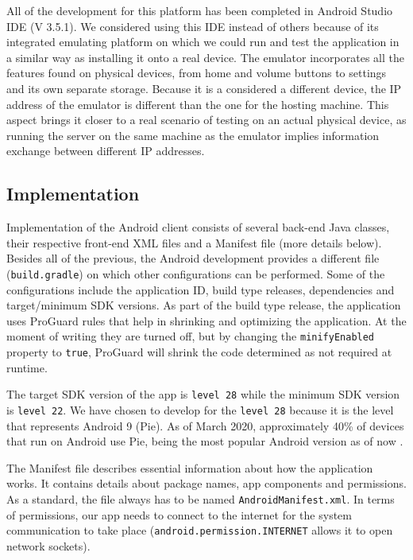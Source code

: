 All of the development for this platform has been completed in Android Studio IDE (V 3.5.1). We considered using this IDE instead of others because of its integrated emulating platform on which we could run and test the application in a similar way as installing it onto a real device. The emulator incorporates all the features found on physical devices, from home and volume buttons to settings and its own separate storage. Because it is a considered a different device, the IP address of the emulator is different than the one for the hosting machine. This aspect brings it closer to a real scenario of testing on an actual physical device, as running the server on the same machine as the emulator implies information exchange between different IP addresses.

\subsection{Implementation}
\label{android-implementation}

Implementation of the Android client consists of several back-end Java classes, their respective front-end XML files and a Manifest file (more details below). Besides all of the previous, the Android development provides a different file (\verb|build.gradle|) on which other configurations can be performed. Some of the configurations include the application ID, build type releases, dependencies and target/minimum SDK versions. As part of the build type release, the application uses ProGuard rules that help in shrinking and optimizing the application. At the moment of writing they are turned off, but by changing the \verb|minifyEnabled| property to \verb|true|, ProGuard will shrink the code determined as not required at runtime.

The target SDK version of the app is \verb|level 28| while the minimum SDK version is \verb|level 22|. We have chosen to develop for the \verb|level 28| because it is the level that represents Android 9 (Pie). As of March 2020, approximately 40\% of devices that run on Android use Pie, being the most popular Android version as of now \cite{android-pie-market-share}. 

The Manifest file describes essential information about how the application works. It contains details about package names, app components and permissions. As a standard, the file always has to be named \verb|AndroidManifest.xml|. In terms of permissions, our app needs to connect to the internet for the system communication to take place (\verb|android.permission.INTERNET| allows it to open network sockets).

